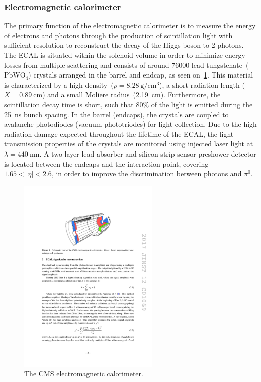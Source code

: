 \subsubsection{Electromagnetic calorimeter}
The primary function of the electromagnetic calorimeter is to measure the energy of electrons and photons through the production of scintillation light with sufficient resolution to reconstruct the decay of the Higgs boson to 2 photons. The ECAL is situated within the solenoid volume in order to minimize energy losses from multiple scattering and consists of around 76000 lead-tungstenate~($\mathrm{PbWO}_4$) crystals arranged in the barrel and endcap, as seen on~\cref{fig:cms_ecal}. This material is characterized by a high density~($\rho = 8.28~\mathrm{g}/\mathrm{cm}^3$), a short radiation length ($X=0.89~\mathrm{cm}$) and a small Moliere radius~(2.19~cm). Furthermore, the scintillation decay time is short, such that 80\% of the light is emitted during the 25~ns bunch spacing. In the barrel (endcaps), the crystals are coupled to avalanche photodiodes (vacuum phototriodes) for light collection. Due to the high radiation damage expected throughout the lifetime of the ECAL, the light transmission properties of the crystals are monitored using injected laser light at $\lambda = 440~\mathrm{nm}$. A two-layer lead absorber and silicon strip sensor preshower detector is located between the endcaps and the interaction point, covering $1.65 < |\eta| < 2.6$, in order to improve the discrimination between photons and $\pi^0$.

\begin{figure}
\begin{centering}
\includegraphics[width=0.6\textwidth]{figures/exp/ecal.pdf}
\caption{The CMS electromagnetic calorimeter.}
\label{fig:cms_ecal}
\end{centering}
\end{figure}

